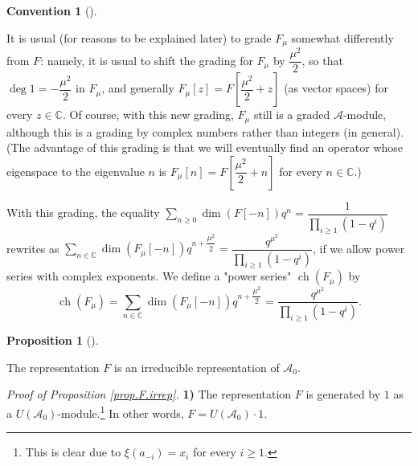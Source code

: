 \documentclass
[numbers=enddot,12pt,final,onecolumn,german,notitlepage]{scrartcl}%
\theoremstyle{definition}
\newtheorem{prop}[theo]{Proposition}
\newenvironment{proposition}[1][]
{\begin{prop}[#1]\begin{leftbar}}
{\end{leftbar}\end{prop}}
\newtheorem{conv}[theo]{Convention}
\newenvironment{Convention}[1][]
{\begin{conv}[#1]\begin{leftbar}}
{\end{leftbar}\end{conv}}
\begin{document}
\begin{Convention}
\label{conv.fockgrad}It is usual (for reasons to be explained later) to grade
$F_{\mu}$ somewhat differently from $F$: namely, it is usual to shift the
grading for $F_{\mu}$ by $\dfrac{\mu^{2}}{2}$, so that $\deg1=-\dfrac{\mu^{2}%
}{2}$ in $F_{\mu}$, and generally $F_{\mu}\left[  z\right]  =F\left[
\dfrac{\mu^{2}}{2}+z\right]  $ (as vector spaces) for every $z\in\mathbb{C}$.
Of course, with this new grading, $F_{\mu}$ still is a graded $\mathcal{A}%
$-module, although this is a grading by complex numbers rather than integers
(in general). (The advantage of this grading is that we will eventually find
an operator whose eigenspace to the eigenvalue $n$ is $F_{\mu}\left[
n\right]  =F\left[  \dfrac{\mu^{2}}{2}+n\right]  $ for every $n\in\mathbb{C}$.)

With this grading, the equality $\sum\limits_{n\geq0}\dim\left(  F\left[
-n\right]  \right)  q^{n}=\dfrac{1}{\prod\limits_{i\geq1}\left(
1-q^{i}\right)  }$ rewrites as $\sum\limits_{n\in\mathbb{C}}\dim\left(
F_{\mu}\left[  -n\right]  \right)  q^{n+\dfrac{\mu^{2}}{2}}=\dfrac{q^{\mu^{2}%
}}{\prod\limits_{i\geq1}\left(  1-q^{i}\right)  }$, if we allow power series
with complex exponents. We define a "power series" $\operatorname*{ch}\left(
F_{\mu}\right)  $ by%
\[
\operatorname*{ch}\left(  F_{\mu}\right)  =\sum\limits_{n\in\mathbb{C}}%
\dim\left(  F_{\mu}\left[  -n\right]  \right)  q^{n+\dfrac{\mu^{2}}{2}}%
=\dfrac{q^{\mu^{2}}}{\prod\limits_{i\geq1}\left(  1-q^{i}\right)  }.
\]

\end{Convention}

\begin{proposition}
\label{prop.F.irrep}The representation $F$ is an irreducible representation of
$\mathcal{A}_{0}$.
\end{proposition}

\textit{Proof of Proposition \ref{prop.F.irrep}.} \textbf{1)} The
representation $F$ is generated by $1$ as a $U\left(  \mathcal{A}_{0}\right)
$-module.\footnote{This is clear due to $\xi\left(  a_{-i}\right)  =x_{i}$ for
every $i\geq1$.} In other words, $F=U\left(  \mathcal{A}_{0}\right)  \cdot1$.
\end{document}

